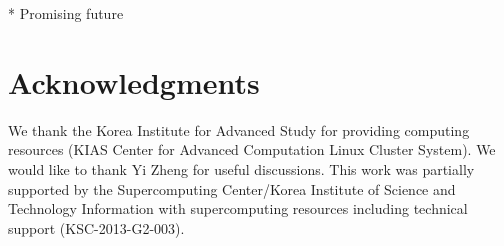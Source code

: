 \documentclass[iop]{emulateapj}
\begin{document}
 * Promising future



\section*{Acknowledgments}

We thank the Korea Institute for Advanced Study for providing computing resources (KIAS Center for Advanced Computation Linux Cluster System).
We would like to thank Yi Zheng for useful discussions.
This work was partially supported by the
Supercomputing Center/Korea Institute of Science and
Technology Information with supercomputing resources
including technical support (KSC-2013-G2-003).


\appendix

\
\end{document}
